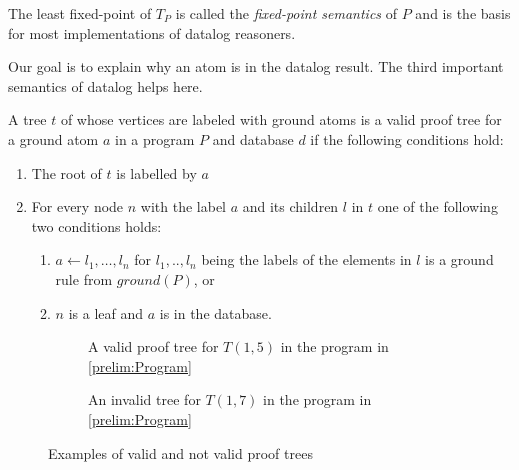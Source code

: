 The least fixed-point of $T_P$ is called the \textit{fixed-point semantics} of $P$ and is the basis for most implementations of datalog reasoners. 

Our goal is to explain why an atom is in the datalog result. The third important semantics of datalog helps here. 

A tree $t$ of whose vertices are labeled with ground atoms is a valid proof tree for a ground atom $a$ in a program $P$ and database $d$ if the following conditions hold:

\begin{enumerate}
    \item The root of $t$ is labelled by $a$
    \item For every node $n$ with the label $a$ and its children $l$ in $t$ one of the following two conditions holds: 
    \begin{enumerate}
        \item $a \leftarrow l_1, \dots ,l_n$ for $l_1,.., l_n$ being the labels of the elements in $l$ is a ground rule from $ground(P)$, or
        \item $n$ is a leaf and $a$ is in the database.
    \end{enumerate}
\end{enumerate}

\begin{figure}[H]
    \centering
    \begin{subfigure}[b]{0.45\linewidth}
    \caption{A valid proof tree for $T(1,5)$ in the program in \cref{prelim:Program}}
    \label{prelim:validTree}
    \end{subfigure}
    \quad
    \begin{subfigure}[b]{0.45\linewidth}
        \caption{An invalid tree for $T(1,7)$ in the program in \cref{prelim:Program}}
        \label{prelim:invalidTree}
    \end{subfigure}

    \caption{Examples of valid and not valid proof trees}
    \end{figure}

